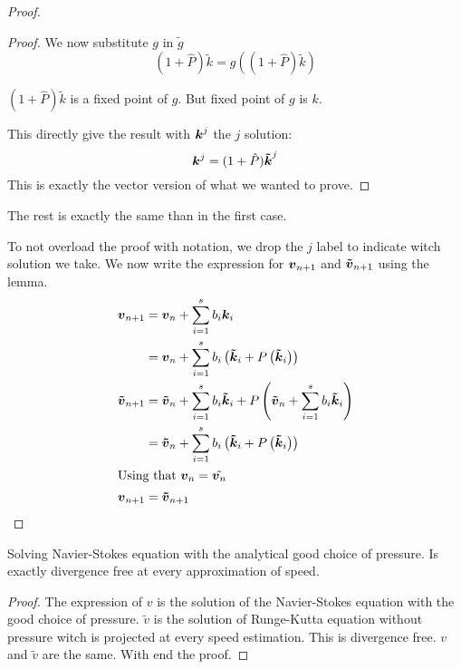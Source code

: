 \begin{proof}
\begin{proof}
We now substitute $g$ in $\tilde{g}$
\begin{equation}
(1+\hat{P})\tilde{k}=g((1+\hat{P})\tilde{k})
\end{equation}

$(1+\hat{P})\tilde{k}$ is a fixed point of $g$.
But fixed point of $g$ is $k$.

This directly give the result with ${\boldsymbol {k}}^{j}$ the $j$ solution:
\begin{equation}
{\boldsymbol {k}}^{j}=(1+\hat{P}){\boldsymbol {\tilde{k}}}^{j}
\end{equation}
This is exactly the vector version of what we wanted to prove.
\end{proof}

The rest is exactly the same than in the first case.

To not overload the proof with notation, we drop the $j$ label to indicate witch solution we take.
We now write the expression for ${\boldsymbol {v}}_{n+1}$ and ${\boldsymbol {\tilde{v}}}_{n+1}$ using the lemma.
\begin{align*}
{\boldsymbol {v}}_{n+1}&={\boldsymbol {v}}_{n}+\sum_{i=1}^{s}b_{i}{\boldsymbol {k}}_{i}\\
&={\boldsymbol {v}}_{n}+\sum_{i=1}^{s}b_{i}\left({\boldsymbol {\tilde{k}}}_{i}+P\left({\boldsymbol {\tilde{k}}}_{i}\right)\right)\\
{\boldsymbol {\tilde{v}}}_{n+1}&={\boldsymbol {\tilde{v}}}_{n}+\sum_{i=1}^{s}b_{i}{\boldsymbol {\tilde{k}}}_{i}+P\left({\boldsymbol {\tilde{v}}}_{n}+\sum_{i=1}^{s}b_{i}{\boldsymbol {\tilde{k}}}_{i}\right)\\
&={\boldsymbol {\tilde{v}}}_{n}+\sum_{i=1}^{s}b_{i}\left({\boldsymbol {\tilde{k}}}_{i}+P\left({\boldsymbol {\tilde{k}}}_{i}\right)\right)\\
\intertext{Using that ${\boldsymbol {v}}_{n}=\tilde{{\boldsymbol {v}}_{n}}$}
{\boldsymbol {v}}_{n+1}&={\boldsymbol {\tilde{v}}}_{n+1}
\end{align*}

\end{proof}

\begin{corollary}
Solving Navier-Stokes equation with the analytical good choice of pressure.
Is exactly divergence free at every approximation of speed.
\end{corollary}
\begin{proof}
  The expression of $v$ is the solution of the Navier-Stokes equation with the good choice of pressure.
  $\tilde{v}$ is the solution of Runge-Kutta equation without pressure witch is projected at every speed estimation.
  This is divergence free.
  $v$ and $\tilde{v}$ are the same. With end the proof.
\end{proof}

